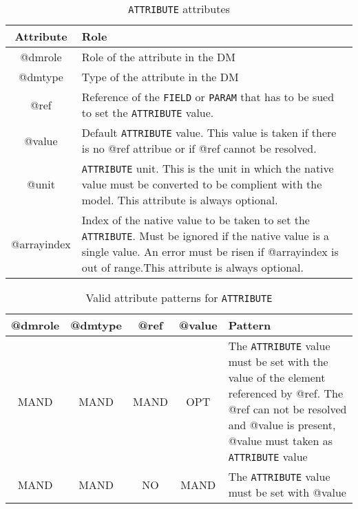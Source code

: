 \begin{table}[!htbp]
\small
\centering
\begin{tabulary}{\linewidth}{|c|J|}       
       \hline 
            \textbf{Attribute} & 
            \textbf {Role}\\
       \hline         \hline  
            @dmrole & 
            Role of the attribute in the DM\\
        \hline 
            @dmtype & 
            Type of the attribute in the DM\\
        \hline 
            @ref & 
            Reference of the \texttt{FIELD} or \texttt{PARAM} that has to be sued to set the \texttt{ATTRIBUTE} value.\\
        \hline 
            @value& 
            Default \texttt{ATTRIBUTE} value. This value is taken if there is no @ref attribue or if @ref cannot be resolved.\\
        \hline 
            @unit & 
            \texttt{ATTRIBUTE} unit. This is the unit in which the native value must be converted to be complient with the model. This attribute is always optional.\\
        \hline 
            @arrayindex & 
            Index of the native value to be taken to set the \texttt{ATTRIBUTE}. Must be ignored if the native value is a single value. An error must be risen if @arrayindex is out of range.This attribute is always optional.\\
        \hline 
     \end{tabulary}
     \caption{\texttt{ATTRIBUTE} attributes} 
     \label{tbl:attribute-att}
 \end{table}

\begin{table}[!htbp]
\small
\centering
\begin{tabulary}{\linewidth}{|c|c|c|c|J|}
    \hline 
        \textbf{@dmrole} &
        \textbf{@dmtype} &
        \textbf{@ref} &
        \textbf{@value} &
        \textbf{Pattern}\\
    \hline      \hline  
        MAND &           
        MAND &           
        MAND &           
        OPT &           
        The \texttt{ATTRIBUTE} value must be set with the value of the element referenced by @ref. The @ref can not be resolved and @value is present, @value must taken as \texttt{ATTRIBUTE} value\\
    \hline   
        MAND &           
        MAND &           
        NO &           
        MAND &           
        The \texttt{ATTRIBUTE} value must be set with @value\\
   \hline 
\end{tabulary}
     \caption{Valid attribute patterns for  \texttt{ATTRIBUTE}} 
     \label{tbl:attribute-pattern}
 \end{table}
